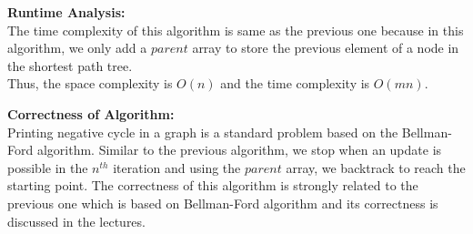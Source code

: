 \documentclass[a4paper]{article}
\newcommand{\algrule}[1][.2pt]{\par\vskip.5\baselineskip\hrule height #1\par\vskip.5\baselineskip}
\begin{document}
\begin{enumerate}[1.]
{\begin{minipage}{\linewidth}
\begin{algorithm}[H]
    \end{algorithm}
    \end{minipage}
    \par}
    
    \textbf{Runtime Analysis:}\\
    The time complexity of this algorithm is same as the previous one because in this algorithm, we only add a $parent$ array to store the previous element of a node in the shortest path tree.\\
    Thus, the space complexity is $O(n)$ and the time complexity is $O(mn)$.
    
    \textbf{Correctness of Algorithm:}\\
    Printing negative cycle in a graph is a standard problem based on the Bellman-Ford algorithm. Similar to the previous algorithm, we stop when an update is possible in the $n^{th}$ iteration and using the $parent$ array, we backtrack to reach the starting point. The correctness of this algorithm is strongly related to the previous one which is based on Bellman-Ford algorithm and its correctness is discussed in the lectures.
    
    \hfill\qedsymbol
\end{enumerate}
\end{document}

